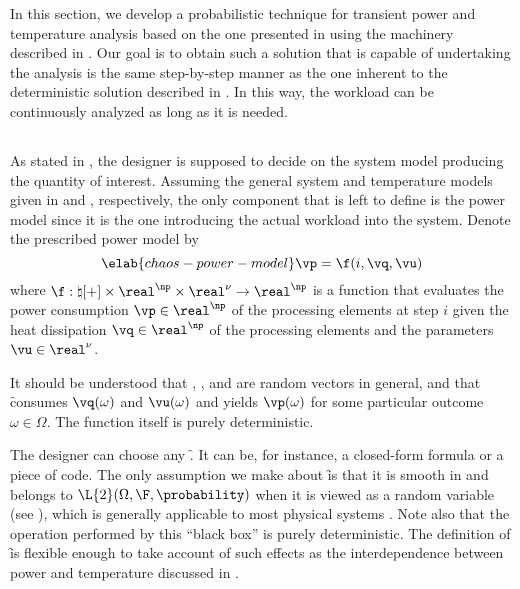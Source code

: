 In this section, we develop a probabilistic technique for transient power and
temperature analysis based on the one presented in
 using the machinery described in
. Our goal is to obtain such a solution that is
capable of undertaking the analysis is the same step-by-step manner as the one
inherent to the deterministic solution described in
. In this way, the workload can be continuously
analyzed as long as it is needed.

\subsection{\problemtitle}

As stated in , the designer is supposed to
decide on the system model producing the quantity of interest. Assuming the
general system and temperature models given in  and
, respectively, the only component that is left to
define is the power model since it is the one introducing the actual workload
into the system. Denote the prescribed power model by
\begin{equation} \elab{chaos-power-model}
  \vp = \f(i, \vq, \vu)
\end{equation}
where $\f: \natural[+] \times \real^\np \times \real^\nu \to \real^\np$ is a
function that evaluates the power consumption $\vp \in \real^\np$ of the
processing elements at step $i$ given the heat dissipation $\vq \in \real^\np$
of the processing elements and the parameters $\vu \in \real^\nu$.

\begin{remark}
It should be understood that \vp, \vq, and \vu are random vectors in general,
and that \f consumes $\vq(\omega)$ and $\vu(\omega)$ and yields $\vp(\omega)$
for some particular outcome $\omega \in \Omega$. The function itself is purely
deterministic.
\end{remark}

The designer can choose any \f. It can be, for instance, a closed-form formula
or a piece of code. The only assumption we make about \f is that it is smooth in
\vz and belongs to $\L{2}(\Omega, \F, \probability)$ when it is viewed as a
random variable (see ), which is generally applicable
to most physical systems \cite{xiu2010}. Note also that the operation performed
by this ``black box'' is purely deterministic. The definition of \f is flexible
enough to take account of such effects as the interdependence between power and
temperature discussed in .

